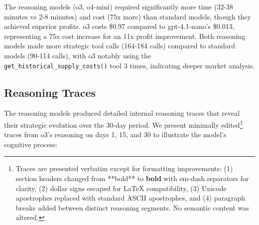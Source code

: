 \documentclass[11pt]{article}
\begin{document}
The reasoning models (o3, o4-mini) required significantly more time (32-38 minutes vs 2-8 minutes) and cost (75x more) than standard models, though they achieved superior profits.
o3 costs \$0.97 compared to gpt-4.1-nano's \$0.013, representing a 75x cost increase for an 11x profit improvement.
Both reasoning models made more strategic tool calls (164-184 calls) compared to standard models (90-114 calls), with o3 notably using the \texttt{get\_historical\_supply\_costs()} tool 3 times, indicating deeper market analysis.

\subsection{Reasoning Traces}

The reasoning models produced detailed internal reasoning traces that reveal their strategic evolution over the 30-day period.
We present minimally edited\footnote{Traces are presented verbatim except for formatting improvements: (1) section headers changed from **bold** to \textbf{bold} with em-dash separators for clarity, (2) dollar signs escaped for LaTeX compatibility, (3) Unicode apostrophes replaced with standard ASCII apostrophes, and (4) paragraph breaks added between distinct reasoning segments. No semantic content was altered.} traces from o3's reasoning on days 1, 15, and 30 to illustrate the model's cognitive process:
\end{document}
